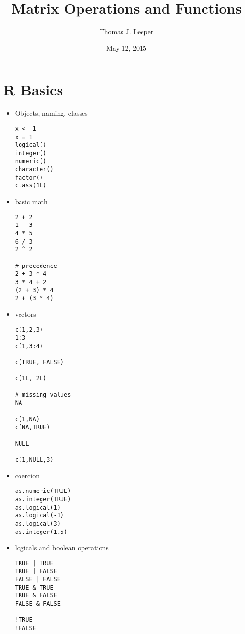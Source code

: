 \documentclass[a4paper,12pt]{article}
\title{Matrix Operations and Functions}
\author{Thomas J. Leeper}
\date{May 12, 2015}
\begin{document}
\maketitle

\doublespacing

\section{R Basics}


\begin{itemize}

\item Objects, naming, classes

\begin{lstlisting}
x <- 1
x = 1
logical()
integer()
numeric()
character()
factor()
class(1L)
\end{lstlisting}

\item basic math

\begin{lstlisting}
2 + 2
1 - 3
4 * 5
6 / 3
2 ^ 2

# precedence
2 + 3 * 4
3 * 4 + 2
(2 + 3) * 4
2 + (3 * 4)
\end{lstlisting}



\item vectors

\begin{lstlisting}
c(1,2,3)
1:3
c(1,3:4)

c(TRUE, FALSE)

c(1L, 2L)

# missing values
NA

c(1,NA)
c(NA,TRUE)

NULL

c(1,NULL,3)
\end{lstlisting}

\item coercion

\begin{lstlisting}
as.numeric(TRUE)
as.integer(TRUE)
as.logical(1)
as.logical(-1)
as.logical(3)
as.integer(1.5)
\end{lstlisting}

\item logicals and boolean operations

\begin{lstlisting}
TRUE | TRUE
TRUE | FALSE
FALSE | FALSE
TRUE & TRUE
TRUE & FALSE
FALSE & FALSE

!TRUE
!FALSE


\end{lstlisting}
\end{itemize}
\end{document}
